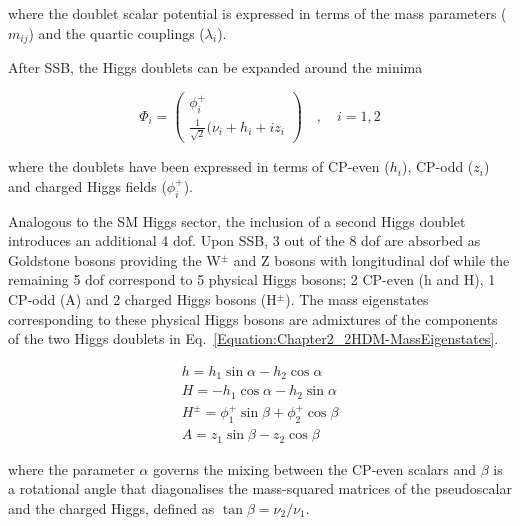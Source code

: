 where the doublet scalar potential is expressed in terms of the mass parameters ($m_{ij}$) and the quartic couplings ($\lambda_i$).

After SSB, the Higgs doublets can be expanded around the minima

\begin{equation}
    \Phi_i = \begin{pmatrix}
        \phi_i^+ \\
        \frac{1}{\sqrt{2}}(\nu_i + h_i + iz_i
    \end{pmatrix} \quad,\quad i=1,2
\end{equation}

where the doublets have been expressed in terms of CP-even ($h_i$), CP-odd ($z_i$) and charged Higgs fields ($\phi_i^+$).

Analogous to the SM Higgs sector, the inclusion of a second Higgs doublet introduces an additional 4 dof. Upon SSB, 3 out of the 8 dof are absorbed as Goldstone bosons providing the W$^{\pm}$ and Z bosons with longitudinal dof while the remaining 5 dof correspond to 5 physical Higgs bosons; 2 CP-even (h and H), 1 CP-odd (A) and 2 charged Higgs bosons (H$^{\pm}$). The mass eigenstates corresponding to these physical Higgs bosons are admixtures of the components of the two Higgs doublets in Eq.~\ref{Equation:Chapter2_2HDM-MassEigenstates}.

\begin{equation}
\begin{array}{c}
     h = h_1 \sin{\alpha} - h_2 \cos{\alpha} \\
     H = - h_1 \cos{\alpha} - h_2 \sin{\alpha} \\
     H^\pm = \phi_1^+ \sin{\beta} + \phi_2^+ \cos{\beta} \\
     A = z_1 \sin{\beta} - z_2 \cos{\beta}
\end{array}
\label{Equation:Chapter2_2HDM-MassEigenstates}
\end{equation}

where the parameter $\alpha$ governs the mixing between the CP-even scalars and $\beta$ is a rotational angle that diagonalises the mass-squared matrices of the pseudoscalar and the charged Higgs, defined as $\tan{\beta} = \nu_2/\nu_1$.

